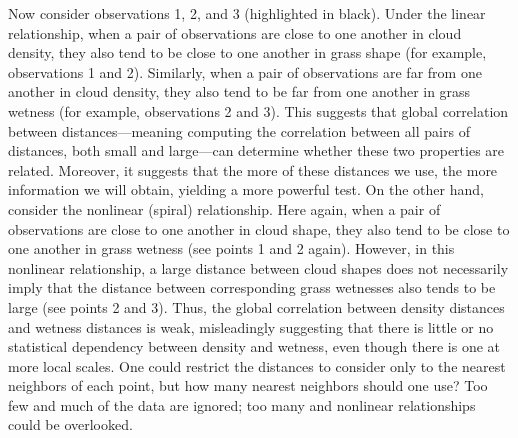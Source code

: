 \documentclass[11pt]{article}
\begin{document}
Now consider observations  1, 2, and 3 (highlighted in black).  Under the linear relationship, when a pair of observations are close to one another in cloud density, they  also tend to be close to one another in grass shape (for example, observations 1 and 2).  
Similarly, %
when a pair of observations are far from one another in cloud density, they also tend to be far from one another in grass wetness (for example, observations 2 and 3).  This suggests that global correlation between distances---meaning computing the correlation between all pairs of distances, both small and large---can determine whether these two properties are related.  
Moreover, it suggests that the more of these distances we use, the more information we will obtain, yielding a more powerful test.
% 
On the other hand, consider the nonlinear (spiral) relationship.  Here again, when a pair of observations are close to one another in cloud shape, they also tend to be close to one another in grass wetness (see points 1 and 2 again).  However, in this nonlinear relationship,  a large distance between cloud shapes does not necessarily imply that the distance between corresponding grass wetnesses also tends to be large (see points 2 and 3).
Thus, the global correlation between density distances and wetness distances is weak, misleadingly suggesting that there is little or no statistical dependency between density and wetness, even though there is one at more local scales.
One could restrict the distances to consider only to the nearest neighbors of each point, but how many nearest neighbors should one use?  Too few and much of the data are ignored; too many and nonlinear relationships could be overlooked. 
  
\end{document}
